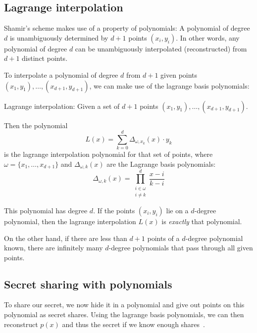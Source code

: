\subsection{Lagrange interpolation}
Shamir's scheme makes use of a property of polynomials: A polynomial of degree $d$ is unambiguously determined by $d+1$ points $(x_i, y_i)$.
In other words, any polynomial of degree $d$ can be unambiguously interpolated (reconstructed) from $d+1$ distinct points.

To interpolate a polynomial of degree $d$ from $d+1$ given points $(x_1, y_1), \dots, (x_{d+1}, y_{d+1})$, we can make use of the lagrange basis polynomials:~\cite{yao_lightweight_2015}

\begin{definition}
    Lagrange interpolation: Given a set of $d+1$ points $(x_1, y_1), \dots, (x_{d+1}, y_{d+1})$.

    Then the polynomial 
    \begin{equation}
        L(x) = \sum_{k=0}^d \Delta_{\omega, x_k}(x) \cdot y_k
    \end{equation}
    is the lagrange interpolation polynomial for that set of points, where $\omega = \{x_1, \dots, x_{d+1}\}$ and $\Delta_{\omega,k}(x)$ are the Lagrange basis polynomials:
    \begin{equation}
        \Delta_{\omega,k}(x) = \prod_{\substack{i\in\omega\\ i \neq k}}^d \frac{x-i}{k-i}
    \end{equation}
\end{definition}

This polynomial has degree $d$. If the points $(x_i, y_i)$ lie on a $d$-degree polynomial, then the lagrange interpolation $L(x)$ is \emph{exactly} that polynomial.

On the other hand, if there are less than $d+1$ points of a $d$-degree polynomial known, there are infinitely many $d$-degree polynomials that pass through all given points.~\cite{shamir_how_1979}


\subsection{Secret sharing with polynomials}
To share our secret, we now hide it in a polynomial and give out points on this polynomial as secret shares.
Using the lagrange basis polynomials, we can then reconstruct $p(x)$ and thus the secret if we know enough shares~\cite{shamir_how_1979}.

